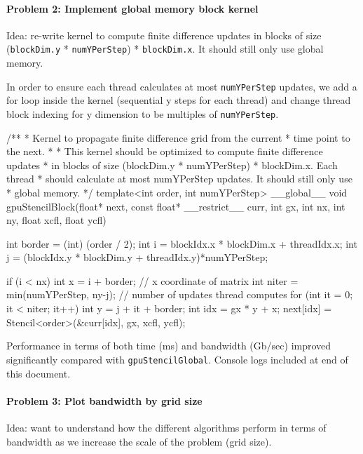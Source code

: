 \documentclass[12pt,letterpaper,twoside]{article}
\begin{document}
\paragraph{Problem 2: Implement global memory block kernel } Idea: re-write 
kernel to compute finite difference updates in blocks of size (\texttt{blockDim.y} 
* \texttt{numYPerStep}) * \texttt{blockDim.x}. It should still only use 
global memory.

In order to ensure each thread calculates at most \texttt{numYPerStep} updates, we add 
a for loop inside the kernel (sequential y steps for each thread) and change thread 
block indexing for y dimension to be multiples of \texttt{numYPerStep}.

\begin{cpp}
/**
 * Kernel to propagate finite difference grid from the current
 * time point to the next.
 *
 * This kernel should be optimized to compute finite difference updates
 * in blocks of size (blockDim.y * numYPerStep) * blockDim.x. Each thread
 * should calculate at most numYPerStep updates. It should still only use
 * global memory.
 */
template<int order, int numYPerStep>
__global__
void gpuStencilBlock(float* next, const float* __restrict__ curr, int gx, int nx, int ny,
                    float xcfl, float ycfl) {
    
    int border = (int) (order / 2);
    int i = blockIdx.x * blockDim.x + threadIdx.x;
    int j = (blockIdx.y * blockDim.y + threadIdx.y)*numYPerStep;

    if (i < nx) {
	    int x = i + border;  // x coordinate of matrix
        int niter = min(numYPerStep, ny-j);  // number of updates thread computes
        for (int it = 0; it < niter; it++) {
            int y = j + it + border;
                int idx = gx * y + x;
                next[idx] = Stencil<order>(&curr[idx], gx, xcfl, ycfl);
        }
    }
}
\end{cpp}

Performance in terms of both time (ms) and bandwidth (Gb/sec) improved significantly
compared with \texttt{gpuStencilGlobal}. Console logs included at end of this document.


\paragraph{Problem 3: Plot bandwidth by grid size } Idea: want to understand how the 
different algorithms perform in terms of bandwidth as we increase the scale of the 
problem (grid size).
\end{document}
